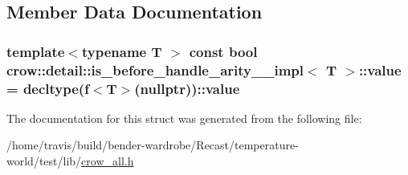 \subsection{Member Data Documentation}
\hypertarget{structcrow_1_1detail_1_1is__before__handle__arity__3__impl_a35fa3f816aea7a81a099219f6c149bfc}{
\subsubsection[{value}]{\setlength{\rightskip}{0pt plus 5cm}template$<$typename T $>$ const bool {\bf crow\-::detail\-::is\-\_\-before\-\_\-handle\-\_\-arity\-\_\-\_\-impl}$<$ T $>$\-::value = decltype({\bf f}$<$T$>$(nullptr))\-::value\hspace{0.3cm}{\ttfamily [static]}}}\label{structcrow_1_1detail_1_1is__before__handle__arity__3__impl_a35fa3f816aea7a81a099219f6c149bfc}


The documentation for this struct was generated from the following file\-:\begin{DoxyCompactItemize}
\item 
/home/travis/build/bender-\/wardrobe/\-Recast/temperature-\/world/test/lib/\hyperlink{crow__all_8h}{crow\-\_\-all.\-h}\end{DoxyCompactItemize}
